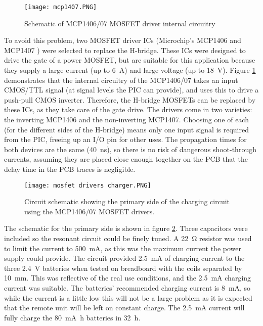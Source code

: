 \begin{figure}[htbp]
	\centering
	\texttt{[image: mcp1407.PNG]}
	\caption{Schematic of MCP1406/07 MOSFET driver internal circuitry \cite{mcp1407}}
	\label{fig: mcp1407}
\end{figure}

To avoid this problem, two MOSFET driver ICs (Microchip's MCP1406 and MCP1407 \cite{mcp1407}) were selected to replace the H-bridge. These ICs were designed to drive the gate of a power MOSFET, but are suitable for this application because they supply a large current (up to \SI{6}{\ampere}) and large voltage (up to \SI{18}{\volt}). Figure \ref{fig: mcp1407} demonstrates that the internal circuitry of the MCP1406/07 takes an input CMOS/TTL signal (at signal levels the PIC can provide), and uses this to drive a push-pull CMOS inverter. Therefore, the H-bridge MOSFETs can be replaced by these ICs, as they take care of the gate drive. The drivers come in two varieties: the inverting MCP1406 and the non-inverting MCP1407. Choosing one of each (for the different sides of the H-bridge) means only one input signal is required from the PIC, freeing up an I/O pin for other uses. The propagation times for both devices are the same (\SI{40}{\nano\second}), so there is no risk of dangerous shoot-through currents, assuming they are placed close enough together on the PCB that the delay time in the PCB traces is negligible.\\

\begin{figure}[htbp]
	\centering
	\texttt{[image: mosfet drivers charger.PNG]}
	\caption{Circuit schematic showing the primary side of the charging circuit using the MCP1406/07 MOSFET drivers.}
	\label{fig: mosfet drivers charger}
\end{figure}

The schematic for the primary side is shown in figure \ref{fig: mosfet drivers charger}. Three capacitors were included so the resonant circuit could be finely tuned. A \SI{22}{\ohm} resistor was used to limit the current to \SI{500}{\milli\ampere}, as this was the maximum current the power supply could provide. The circuit provided \SI{2.5}{\milli\ampere} of charging current to the three \SI{2.4}{\volt} batteries when tested on breadboard with the coils separated by \SI{10}{\milli\metre}. This was reflective of the real use conditions, and the \SI{2.5}{\milli\ampere} charging current was suitable. The batteries' recommended charging current is \SI{8}{\milli\ampere}, so while the current is a little low this will not be a large problem as it is expected that the remote unit will be left on constant charge. The \SI{2.5}{\milli\ampere} current will fully charge the \SI{80}{\milli\ampere\hour} batteries in \SI{32}{\hour}.\\


